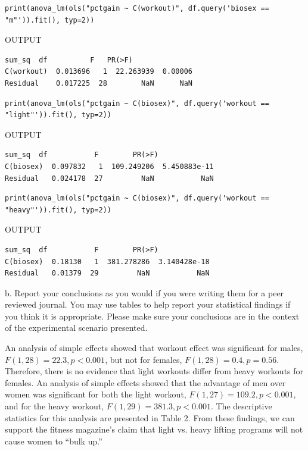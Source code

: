 \documentclass[onecolumn,10pt]{jhwhw}
\begin{document}
\begin{lstlisting}
print(anova_lm(ols("pctgain ~ C(workout)", df.query('biosex == "m"')).fit(), typ=2))
\end{lstlisting}
\noindent OUTPUT
\begin{lstlisting}[language={}]
              sum_sq  df          F   PR(>F)
C(workout)  0.013696   1  22.263939  0.00006
Residual    0.017225  28        NaN      NaN
\end{lstlisting}

\begin{lstlisting}
print(anova_lm(ols("pctgain ~ C(biosex)", df.query('workout == "light"')).fit(), typ=2))
\end{lstlisting}
\noindent OUTPUT
\begin{lstlisting}[language={}]
             sum_sq  df           F        PR(>F)
C(biosex)  0.097832   1  109.249206  5.450883e-11
Residual   0.024178  27         NaN           NaN
\end{lstlisting}

\begin{lstlisting}
print(anova_lm(ols("pctgain ~ C(biosex)", df.query('workout == "heavy"')).fit(), typ=2))
\end{lstlisting}
\noindent OUTPUT
\begin{lstlisting}[language={}]
            sum_sq  df           F        PR(>F)
C(biosex)  0.18130   1  381.278286  3.140428e-18
Residual   0.01379  29         NaN           NaN
\end{lstlisting}

b. Report your conclusions as you would if you were writing them for a peer reviewed journal. You may use tables to help report your statistical findings if you think it is appropriate. Please make sure your conclusions are in the context of the experimental scenario presented.

An analysis of simple effects showed that workout effect was significant for males, $F(1, 28) = 22.3, p < 0.001$, but not for females, $F(1, 28) = 0.4, p = 0.56$. Therefore, there is no evidence that light workouts differ from heavy workouts for females. An analysis of simple effects showed that the advantage of men over women was significant for both the light workout, $F(1, 27) = 109.2, p < 0.001$, and for the heavy workout, $F(1, 29) = 381.3, p < 0.001$. The descriptive statistics for this analysis are presented in Table 2. From these findings, we can support the fitness magazine's claim that light vs. heavy lifting programs will not cause women to ``bulk up.''
\end{document}
